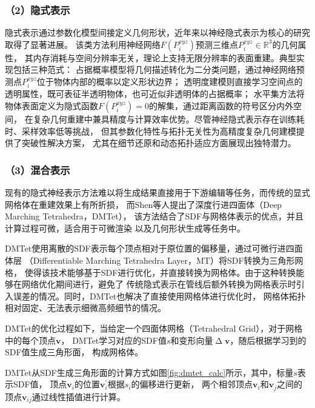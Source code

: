 \subsubsection*{（2）隐式表示} 

隐式表示通过参数化模型间接定义几何形状，近年来以神经隐式表示为核心的研究取得了显著进展。
该类方法利用神经网络$F(P_i^{xyz})$预测三维点$P_i^{xyz}\in\mathbb{R}^3$的几何属性，
其内存消耗与空间分辨率无关，理论上支持无限分辨率的表面重建。典型实现包括三种范式：
占据概率模型将几何描述转化为二分类问题，通过神经网络预测点$P_i^{xyz}$位于物体内部的概率以定义形状边界；
透明度建模则直接学习空间点的透明属性，既可表征半透明物体，也可近似非透明体的占据概率；
水平集方法将物体表面定义为隐式函数$F(P_i^{xyz})=0$的解集，通过距离函数的符号区分内外空间，
在复杂几何重建中兼具精度与计算效率优势。尽管神经隐式表示存在训练耗时、采样效率低等挑战，
但其参数化特性与拓扑无关性为高精度复杂几何建模提供了突破性解决方案，
尤其在细节还原和动态拓扑适应方面展现出独特潜力。

\subsubsection*{（3）混合表示} 

现有的隐式神经表示方法难以将生成结果直接用于下游编辑等任务，而传统的显式网格体在重建效果上有所折损，
而Shen等人\cite{shen2021deep}提出了深度行进四面体（Deep Marching Tetrahedra，DMTet），
该方法结合了SDF与网格体表示的优点，并且计算过程可微，适合用于可微渲染\cite{Laine2020ModularPF}
以及几何形状生成\cite{gao2022get3d,Liu2023One2345AS}等任务中。

DMTet使用离散的SDF表示每个顶点相对于原位置的偏移量，通过可微行进四面体层
（Differentiable Marching Tetrahedra Layer，MT）将SDF转换为三角形网格，
使得该技术能够基于SDF进行优化，并直接转换为网格体。由于这种转换能够在网络优化期间进行，避免了
传统隐式表示在管线后额外转换为网格表示时引入误差的情况。同时，DMTet也解决了直接使用网格体进行优化时，
网格体拓扑相对固定、无法表示细微高频细节的情况。

DMTet的优化过程如下，当给定一个四面体网格（Tetrahedral Grid），对于网格中的每个顶点${\boldsymbol{v}}$，
DMTet学习对应的SDF值$s$和变形向量$\upDelta\boldsymbol{v}$，随后根据学习到的SDF值生成三角形面，
构成网格体。

DMTet从SDF生成三角形面的计算方式如图\ref{fig:dmtet_calc}所示，其中，标量$s$表示SDF值，
顶点${\boldsymbol{v}}_i$的位置${\boldsymbol{v}}_i^\prime$根据$s_i$的偏移进行更新，
两个相邻顶点${\boldsymbol{v}}_i$和${\boldsymbol{v}}_j$之间的顶点${\boldsymbol{v}}_{ij}$通过线性插值进行计算。

